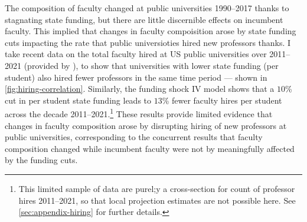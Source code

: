 The composition of faculty changed at public universities 1990--2017 thanks to stagnating state funding, but there are little discernible effects on incumbent faculty.
This implied that changes in faculty compoisition arose by state funding cuts impacting the rate that public universioties hired new professors thanks.
I take recent data on the total faculty hired at US public universities over 2011--2021 (provided by \citealt{wapman2022quantifying}), to show that universities with lower state funding (per student) also hired fewer professors in the same time period --- shown in \autoref{fig:hiring-correlation}.
Similarly, the funding shock IV model shows that a $10$\% cut in per student state funding leads to $13$\% fewer faculty hires per student across the decade 2011--2021.\footnote{
    This limited sample of data are purel;y a cross-section for count of professor hires 2011--2021, so that local projection estimates are not possible here.
    See \autoref{sec:appendix-hiring} for further details.
}
These results provide limited evidence that changes in faculty composition arose by disrupting hiring of new professors at public universities, corresponding to the concurrent results that faculty composition changed while incumbent faculty were not by meaningfully affected by the funding cuts.
